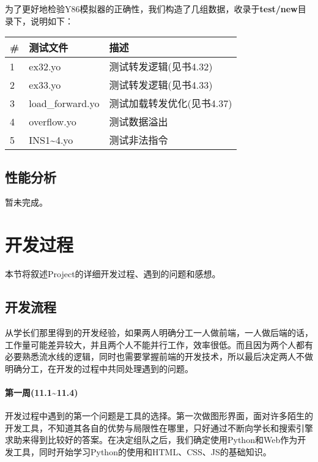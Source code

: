 \documentclass[12pt]{article} %
\begin{document}
\begin{sloppypar}
为了更好地检验Y86模拟器的正确性，我们构造了几组数据，收录于{\bf test/new}目录下，说明如下：

\begin{table}[h]
\begin{tabular}{|l|l|l|}
\hline
{\bf \#} & {\bf 测试文件}                          & {\bf 描述}                   \\ 
\hline
1        & ex32.yo	                   & 测试转发逻辑(见书4.32)        \\ 
\hline
2        & ex33.yo                       & 测试转发逻辑(见书4.33)           \\ 
\hline
3        & load\_forward.yo	        & 测试加载转发优化(见书4.37)            \\ 
\hline
4        & overflow.yo          & 测试数据溢出               \\ 
\hline
5        & INS1\~{}4.yo             & 测试非法指令                   \\ 
\hline
\end{tabular}
\end{table}

\subsection{性能分析}

暂未完成。

\clearpage
\section{开发过程}

本节将叙述Project的详细开发过程、遇到的问题和感想。

\subsection{开发流程}

从学长们那里得到的开发经验，如果两人明确分工一人做前端，一人做后端的话，工作量可能差异较大，并且两个人不能并行工作，效率很低。而且因为两个人都有必要熟悉流水线的逻辑，同时也需要掌握前端的开发技术，所以最后决定两人不做明确分工，在开发的过程中共同处理遇到的问题。

\paragraph{第一周(11.1\~{}11.4)}

开发过程中遇到的第一个问题是工具的选择。第一次做图形界面，面对许多陌生的开发工具，不知道其各自的优势与局限性在哪里，只好通过不断向学长和搜索引擎求助来得到比较好的答案。在决定组队之后，我们确定使用Python和Web作为开发工具，同时开始学习Python的使用和HTML、CSS、JS的基础知识。


\end{sloppypar}
\end{document}
